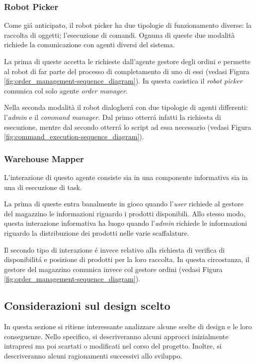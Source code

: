 \subsubsection{Robot Picker}
Come gi\'a anticipato, il robot picker ha due tipologie di funzionamento diverse: la raccolta di oggetti; l'esecuzione di comandi. Ognuna di queste due modalità richiede la comunicazione con agenti diversi del sistema.

La prima di queste accetta le richieste dall'agente gestore degli ordini e permette al robot di far parte del processo di completamento di uno di essi (vedasi Figura \ref{fig:order_management-sequence_diagram}). In questa casistica il \textit{robot picker} comunica col solo agente \textit{order manager}.

Nella seconda modalità il robot dialogher\'a con due tipologie di agenti differenti: l'\textit{admin} e il \textit{command manager}. Dal primo otterr\'a infatti la richiesta di esecuzione, mentre dal secondo otterr\'a lo script ad essa necessario (vedasi Figura \ref{fig:command_execution-sequence_diagram}).

\subsubsection{Warehouse Mapper}
L'interazione di questo agente consiste sia in una componente informativa sia in una di esecuzione di task.

La prima di queste entra banalmente in gioco quando l'\textit{user} richiede al gestore del magazzino le informazioni riguardo i prodotti disponibili. Allo stesso modo, questa interazione informativa ha luogo quando l'\textit{admin} richiede le informazioni riguardo la distribuzione dei prodotti nelle varie scaffalature.

Il secondo tipo di interazione \'e invece relativo alla richiesta di verifica di disponibilit\'a e posizione di prodotti per la loro raccolta. In questa circostanza, il gestore del magazzino comunica invece col gestore ordini (vedasi Figura \ref{fig:order_management-sequence_diagram}).

\subsection{Considerazioni sul design scelto}
In questa sezione si ritiene interessante analizzare alcune scelte di design e le loro conseguenze. Nello specifico, si descriveranno alcuni approcci inizialmente intrapresi ma poi scartati o modificati nel corso del progetto. Inoltre, si descriveranno alcuni ragionamenti successivi allo sviluppo.

